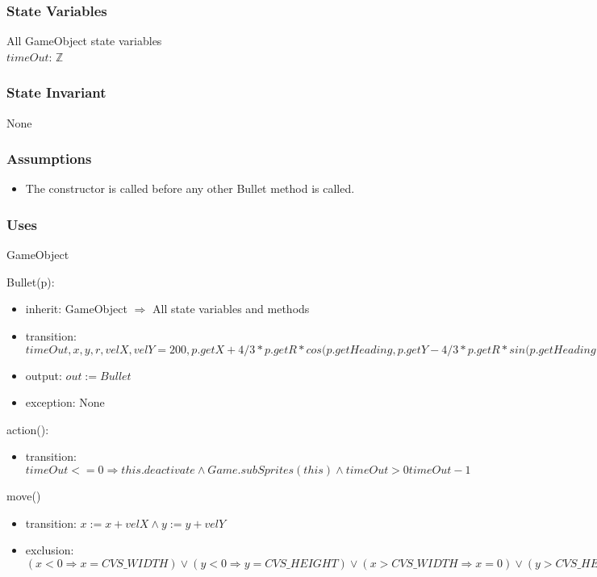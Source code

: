 \documentclass[12pt]{article}
\begin{document}
\subsubsection* {State Variables}

All GameObject state variables\\
$timeOut$: $\mathbb{Z}$\\

\subsubsection* {State Invariant}

None

\subsubsection* {Assumptions}

\begin{itemize}
  \item The constructor is called before any other Bullet method is called.
\end{itemize}

\subsubsection*{Uses}
GameObject

Bullet(p):
\begin{itemize}
    \item inherit: GameObject $\Rightarrow$ All state variables and methods
    \item transition: $timeOut, x, y, r, velX, velY = 200, p.getX + 4/3 * p.getR * cos(p.getHeading, p.getY - 4/3 * p.getR * sin(p.getHeading, 1, p.velX + \mbox{BULLET\_EXTRA} * cos(p.getHeading, p.velY + \mbox{BULLET\_EXTRA} * -sin(p.getHeading) $
    \item output: $out := Bullet$
    \item exception: None
\end{itemize}

\noindent action():
\begin{itemize}
    \item transition: $timeOut <=0 \Rightarrow this.deactivate \land Game.subSprites(this) \land timeOut > 0 timeOut  - 1$
\end{itemize}

\noindent move()
\begin{itemize}
    \item transition: $x := x + velX \land y := y + velY$
    \item exclusion: $(x < 0 \Rightarrow x = CVS\_WIDTH) \lor (y < 0 \Rightarrow y = CVS\_HEIGHT) \lor (x > CVS\_WIDTH \Rightarrow x = 0) \lor (y > CVS\_HEIGHT \Rightarrow y = 0)$
\end{itemize}
\end{document}
